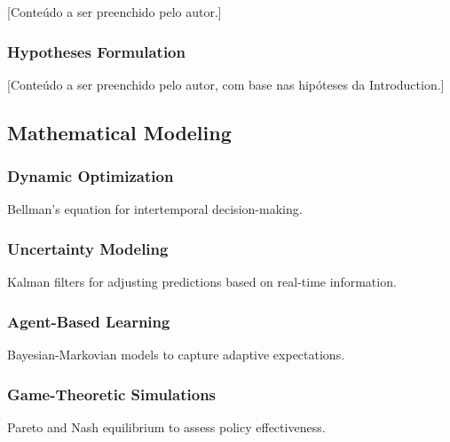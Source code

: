 [Conteúdo a ser preenchido pelo autor.]

\subsubsection{Hypotheses Formulation}

[Conteúdo a ser preenchido pelo autor, com base nas hipóteses da Introduction.]

\subsection{Mathematical Modeling}

\subsubsection{Dynamic Optimization}
Bellman’s equation for intertemporal decision-making.

\subsubsection{Uncertainty Modeling}
Kalman filters for adjusting predictions based on real-time information.

\subsubsection{Agent-Based Learning}
Bayesian-Markovian models to capture adaptive expectations.

\subsubsection{Game-Theoretic Simulations}
Pareto and Nash equilibrium to assess policy effectiveness.

